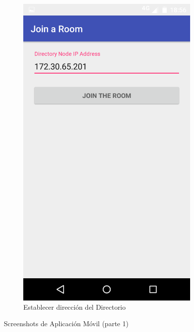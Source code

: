 \begin{figure}[H]
    \begin{subfigure}[b]{0.4\textwidth}
        \includegraphics[width=\textwidth]{imagenes/mobile_connect.png}
        \caption{Establecer dirección del Directorio}
        \label{fig:mobile_set_ip}
    \end{subfigure}
    \caption{Screenshots de Aplicación Móvil (parte 1)}\label{fig:mobile_screenshots_1}
\end{figure}

